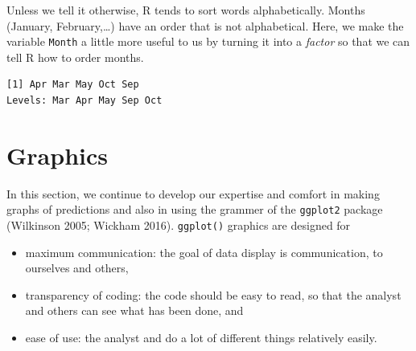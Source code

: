 \documentclass[
  letterpaper,
  DIV=11,
  numbers=noendperiod]{scrreprt}
\newenvironment{Shaded}{\begin{snugshade}}{\end{snugshade}}
\newcommand{\AttributeTok}[1]{\textcolor[rgb]{0.40,0.45,0.13}{#1}}
\newcommand{\CommentTok}[1]{\textcolor[rgb]{0.37,0.37,0.37}{#1}}
\newcommand{\DocumentationTok}[1]{\textcolor[rgb]{0.37,0.37,0.37}{\textit{#1}}}
\newcommand{\FunctionTok}[1]{\textcolor[rgb]{0.28,0.35,0.67}{#1}}
\newcommand{\NormalTok}[1]{\textcolor[rgb]{0.00,0.23,0.31}{#1}}
\newcommand{\OtherTok}[1]{\textcolor[rgb]{0.00,0.23,0.31}{#1}}
\newcommand{\SpecialCharTok}[1]{\textcolor[rgb]{0.37,0.37,0.37}{#1}}
\newcommand{\StringTok}[1]{\textcolor[rgb]{0.13,0.47,0.30}{#1}}
\providecommand{\tightlist}{%
  \setlength{\itemsep}{0pt}\setlength{\parskip}{0pt}}
\begin{document}
Unless we tell it otherwise, R tends to sort words alphabetically.
Months (January, February,\ldots) have an order that is not
alphabetical. Here, we make the variable \texttt{Month} a little more
useful to us by turning it into a \emph{factor} so that we can tell R
how to order months.

\begin{Shaded}
\end{Shaded}

\begin{verbatim}
[1] Apr Mar May Oct Sep
Levels: Mar Apr May Sep Oct
\end{verbatim}

\section{Graphics}\label{graphics}

In this section, we continue to develop our expertise and comfort in
making graphs of predictions and also in using the grammer of the
\texttt{ggplot2} package (Wilkinson 2005; Wickham 2016).
\texttt{ggplot()} graphics are designed for

\begin{itemize}
\tightlist
\item
  maximum communication: the goal of data display is communication, to
  ourselves and others,
\item
  transparency of coding: the code should be easy to read, so that the
  analyst and others can see what has been done, and
\item
  ease of use: the analyst and do a lot of different things relatively
  easily.
\end{itemize}
\end{document}
